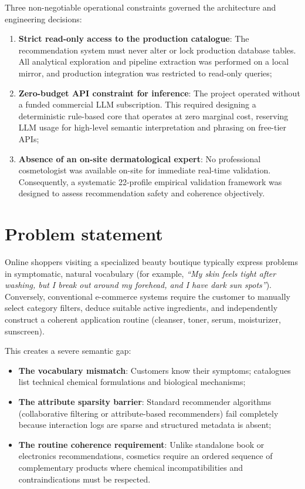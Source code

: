 Three non-negotiable operational constraints governed the architecture and engineering decisions:
\begin{enumerate}
  \item \textbf{Strict read-only access to the production catalogue}: The recommendation system must never alter or lock production database tables. All analytical exploration and pipeline extraction was performed on a local mirror, and production integration was restricted to read-only queries;
  \item \textbf{Zero-budget API constraint for inference}: The project operated without a funded commercial LLM subscription. This required designing a deterministic rule-based core that operates at zero marginal cost, reserving LLM usage for high-level semantic interpretation and phrasing on free-tier APIs;
  \item \textbf{Absence of an on-site dermatological expert}: No professional cosmetologist was available on-site for immediate real-time validation. Consequently, a systematic 22-profile empirical validation framework was designed to assess recommendation safety and coherence objectively.
\end{enumerate}

\section{Problem statement}

Online shoppers visiting a specialized beauty boutique typically express problems in symptomatic, natural vocabulary (for example, \emph{``My skin feels tight after washing, but I break out around my forehead, and I have dark sun spots''}). Conversely, conventional e-commerce systems require the customer to manually select category filters, deduce suitable active ingredients, and independently construct a coherent application routine (cleanser, toner, serum, moisturizer, sunscreen).

This creates a severe semantic gap:
\begin{itemize}
  \item \textbf{The vocabulary mismatch}: Customers know their symptoms; catalogues list technical chemical formulations and biological mechanisms;
  \item \textbf{The attribute sparsity barrier}: Standard recommender algorithms (collaborative filtering or attribute-based recommenders) fail completely because interaction logs are sparse and structured metadata is absent;
  \item \textbf{The routine coherence requirement}: Unlike standalone book or electronics recommendations, cosmetics require an ordered sequence of complementary products where chemical incompatibilities and contraindications must be respected.
\end{itemize}

